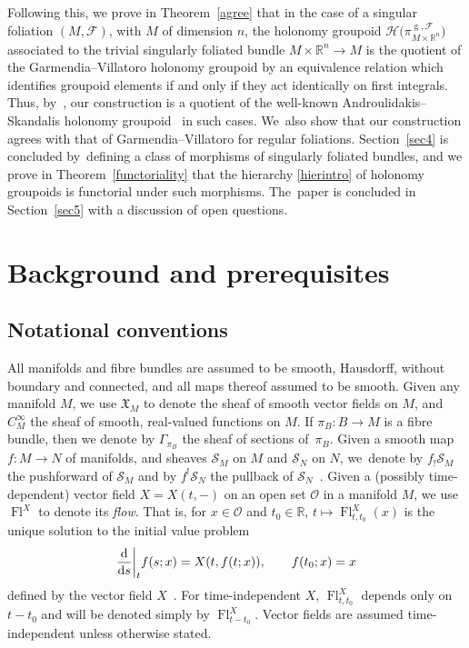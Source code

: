 \documentclass[pdftex]{sigma}
\numberwithin{equation}{section}
\def\g{\operatorname{g}}
\def\Fl{\operatorname{Fl}}
\def\FF{{\mathcal{F}}}
\def\HH{{\mathcal{H}}}
\def\OO{{\mathcal{O}}}
\def\SS{{\mathscr{S}}}
\def\RB{{\mathbb{R}}}
\def\XF{{\mathfrak{X}}}
\begin{document}
Following this, we prove in Theorem~\ref{agree} that in the case of a singular foliation $(M,\FF)$, with $M$ of dimension $n$, the holonomy groupoid $\HH\big(\pi_{M\times\RB^{n}}^{\g,\FF}\big)$ associated to the trivial singularly foliated bundle $M\times\RB^{n}\rightarrow M$ is the quotient of the Garmendia--Villatoro holonomy groupoid by an equivalence relation which identifies groupoid elements if and only if they act identically on first integrals. Thus, by~\cite[Theorem~5.5]{VilGar1}, our construction is a quotient of the well-known Androulidakis--Skandalis holonomy groupoid~\cite{iakovos2} in such cases. We~also show that our construction agrees with that of Garmendia--Villatoro for regular foliations. Section~\ref{sec4} is concluded by~defining a class of morphisms of singularly foliated bundles, and we prove in Theorem~\ref{functoriality} that the hierarchy \eqref{hierintro} of holonomy groupoids is functorial under such morphisms. The~paper is concluded in Section~\ref{sec5} with a discussion of open questions.

\section{Background and prerequisites}\label{sec2}

\subsection{Notational conventions}

All manifolds and fibre bundles are assumed to be smooth, Hausdorff, without boundary and connected, and all maps thereof assumed to be smooth. Given any manifold $M$, we use $\XF_{M}$ to denote the sheaf of smooth vector fields on $M$, and $C^{\infty}_{M}$ the sheaf of smooth, real-valued functions on $M$. If $\pi_{B}\colon B\rightarrow M$ is a fibre bundle, then we denote by $\Gamma_{\pi_{B}}$ the sheaf of sections of~$\pi_{B}$. Given a smooth map $f\colon M\rightarrow N$ of manifolds, and sheaves $\SS_{M}$ on $M$ and $\SS_{N}$ on $N$, we~denote by $f_{!}\SS_{M}$ the pushforward of $\SS_{M}$ and by $f^{!}\SS_{N}$ the pullback of $\SS_{N}$~\cite[p.~65]{hartshorne}. Given a (possibly time-dependent) vector field $X = X(t,-)$ on an open set $\OO$ in a manifold $M$, we use $\Fl^{X}$ to denote its \textit{flow}. That is, for $x\in\OO$ and $t_{0}\in\RB$, $t\mapsto\Fl^{X}_{t,t_{0}}(x)$ is the unique solution to the initial value problem
\begin{gather*}
\frac{\rm d}{{\rm d}s}\bigg|_{t}f(s;x) = X(t,f(t;x)),\qquad f(t_{0};x) = x
\end{gather*}
defined by the vector field $X$~\cite[p.~236]{leesmth}. For time-independent $X$, $\Fl^{X}_{t,t_{0}}$ depends only on $t-t_{0}$ and will be denoted simply by $\Fl^{X}_{t-t_{0}}$. Vector fields are assumed time-independent unless otherwise stated.
\end{document}
